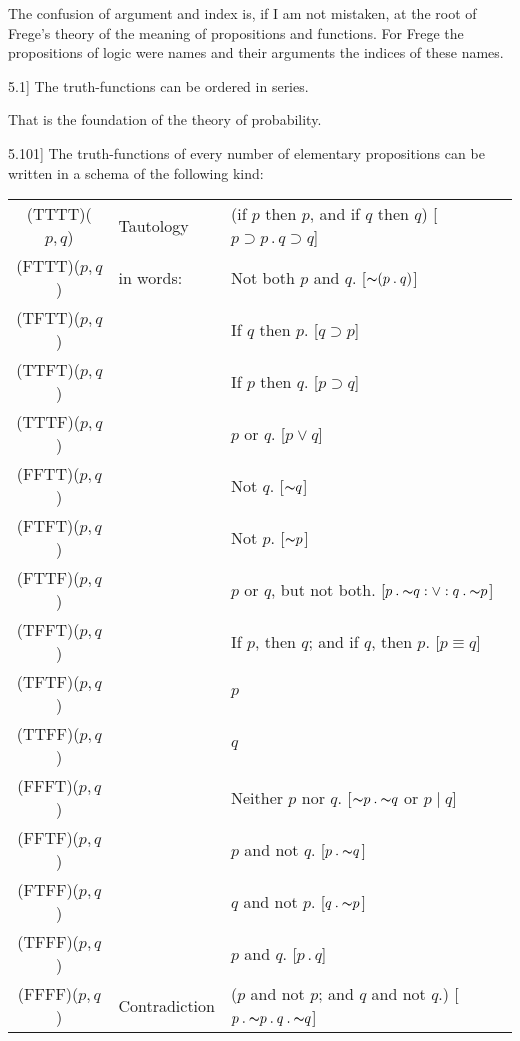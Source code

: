 \documentclass[12pt,oneside]{book}[2007/10/19]
\newcommand{\PropositionE}[2]{%
  \item[\phantomsection\label{PropE:#1}\PropGRef{#1}] #2%
}
\newcommand{\PropGRef}[1]{\hyperref[PropG:#1]{#1}}
\newcommand{\Not}[1]{\mathord{\thicksim} #1}
\newcommand{\DotOp}{\mathbin{.}}
\newcommand{\BarOp}{\mathbin{|}}
\newcommand{\Implies}{\supset}
\newcommand{\ditto}{\quotedblbase}
\newlength{\DittoLen}
\newcommand{\DittoInWords}{%
 \settowidth{\DittoLen}{in}%
 \makebox[\DittoLen]{\ditto}~%
 \settowidth{\DittoLen}{words:}%
 \makebox[\DittoLen]{\ditto}}
\begin{document}
\begin{propositions}
{The confusion of argument and index is, if I
am not mistaken, at the root of Frege's theory
of the meaning of propositions and functions. For
Frege the propositions of logic were names and
their arguments the indices of these names.}


\PropositionE{5.1}
{The truth-functions can be ordered in
series.

That is the foundation of the theory of probability.}
\enlargethispage{-9pt} %

\PropositionE{5.101}
{The truth-functions of every number of elementary
propositions can be written in a schema of
the following kind:

\begin{table*}[!h]
\footnotesize\noindent\centering
\begin{tabular}{@{}c@{~}l@{~}l@{}}
(TTTT)($p, q$) & Tautology & (if $p$ then $p$, and if $q$ then $q$) [$p \Implies p \DotOp q \Implies q$]\\
(FTTT)($p, q$) & in words: & Not both $p$ and $q$. [$\Not{(p \DotOp q)}$]\\
(TFTT)($p, q$) & \DittoInWords & If $q$ then $p$. [$q \Implies p$]\\
(TTFT)($p, q$) & \DittoInWords & If $p$ then $q$. [$p \Implies q$]\\
(TTTF)($p, q$) & \DittoInWords & $p$ or $q$. [$p \lor q$]\\
(FFTT)($p, q$) & \DittoInWords & Not $q$. [$\Not{q}$]\\
(FTFT)($p, q$) & \DittoInWords & Not $p$. [$\Not{p}$]\\
(FTTF)($p, q$) & \DittoInWords & $p$ or $q$, but not both. [$p \DotOp \Not{q} : \lor : q \DotOp \Not{p}$]\\
(TFFT)($p, q$) & \DittoInWords & If $p$, then $q$; and if $q$, then $p$. [$p \equiv q$]\\
(TFTF)($p, q$) & \DittoInWords & $p$\\
(TTFF)($p, q$) & \DittoInWords & $q$\\
(FFFT)($p, q$) & \DittoInWords & Neither $p$ nor $q$. [$\Not{p} \DotOp \Not{q}$ or $p \BarOp q$]\\
(FFTF)($p, q$) & \DittoInWords & $p$ and not $q$. [$p \DotOp \Not{q}$]\\
(FTFF)($p, q$) & \DittoInWords & $q$ and not $p$. [$q \DotOp \Not{p}$]\\
(TFFF)($p, q$) & \DittoInWords & $p$ and $q$. [$p \DotOp q$]\\
(FFFF)($p, q$) & Contradiction & ($p$ and not $p$; and $q$ and not $q$.) [$p \DotOp \Not{p} \DotOp q \DotOp \Not{q}$]\\
\end{tabular}
\end{table*}

}
\end{propositions}
\end{document}
